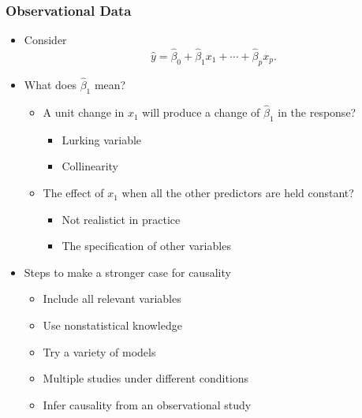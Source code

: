 \documentclass[serif,mathserif,professionalfont]{beamer}
\begin{document}
\begin{frame}
	
	\frametitle{Observational Data}
	
	\begin{itemize}
		\item Consider
		$$ \widehat{y} = \widehat{\beta}_0 + \widehat{\beta}_1 x_1 + \cdots + \widehat{\beta}_p x_p. $$
		\item What does $ \widehat{\beta}_1 $ mean?
		\begin{itemize}
			\item A unit change in $ x_1 $ will produce a change of $ \widehat{\beta}_1 $ in the response?
			\begin{itemize}
				\item Lurking variable
				\item Collinearity
			\end{itemize}
			\item The effect of $ x_1 $ when all the other predictors are held constant?
			\begin{itemize}
				\item Not realistict in practice
				\item The specification of other variables
			\end{itemize}
		\end{itemize}
		\item Steps to make a stronger case for causality
		\begin{itemize}
			\item Include all relevant variables
			\item Use nonstatistical knowledge
			\item Try a variety of models
			\item Multiple studies under different conditions
			\item Infer causality from an observational study
		\end{itemize}
	\end{itemize}
	
	
	
\end{frame}



%	
%	
%
%	
%	
\end{document}
